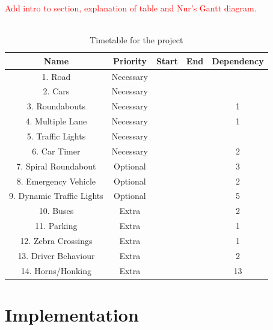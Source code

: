 \documentclass{article}
\begin{document}
\textcolor{red}{Add intro to section, explanation of table and Nur's Gantt diagram.}\\\\
\begin{table}
	\centering
	\label{TimetableForTheProject}
\begin{tabular}{|c|c|c|c|c|}
	\hline {\bf Name} & {\bf Priority} & {\bf Start} & {\bf End} & {\bf Dependency} \\ 
	\hline 1. Road & Necessary &  &  &  \\ 
	\hline 2. Cars& Necessary &  &  &  \\ 
	\hline 3. Roundabouts & Necessary &  &  & 1 \\ 
	\hline 4. Multiple Lane & Necessary &  &  & 1 \\ 
	\hline 5. Traffic Lights & Necessary &  &  &  \\ 
	\hline 6.  Car Timer & Necessary &  &  & 2 \\ 
	\hline 7. Spiral Roundabout & Optional &  &  & 3 \\ 
	\hline 8. Emergency Vehicle & Optional &  &  & 2 \\ 
	\hline 9. Dynamic Traffic Lights & Optional &  &  & 5 \\ 
	\hline 10. Buses& Extra &  &  & 2 \\ 
	\hline  11. Parking & Extra &  &  & 1 \\ 
	\hline  12. Zebra Crossings & Extra &  &  & 1 \\ 
	\hline 13. Driver Behaviour & Extra &  &  & 2 \\ 
	\hline 14. Horns/Honking & Extra &  &  & 13 \\ 
	\hline 
\end{tabular} 
\caption{Timetable for the project}
\end{table}


\section{Implementation}
\end{document}
